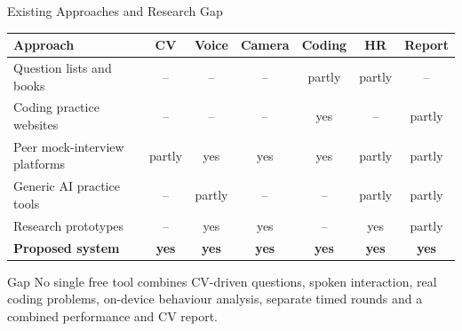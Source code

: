 \documentclass[aspectratio=169,11pt,xcolor=table]{beamer}
\begin{document}
\begin{frame}{Existing Approaches and Research Gap}
  \footnotesize
  \begin{tabularx}{\textwidth}{@{}Ycccccc@{}}
    \toprule
    \textbf{Approach} & \textbf{CV} & \textbf{Voice} & \textbf{Camera} & \textbf{Coding} & \textbf{HR} & \textbf{Report} \\
    \midrule
    Question lists and books & -- & -- & -- & partly & partly & -- \\
    Coding practice websites & -- & -- & -- & yes & -- & partly \\
    Peer mock-interview platforms & partly & yes & yes & yes & partly & partly \\
    Generic AI practice tools & -- & partly & -- & -- & partly & partly \\
    Research prototypes & -- & yes & yes & -- & yes & partly \\
    \textbf{Proposed system} & \textbf{yes} & \textbf{yes} & \textbf{yes} & \textbf{yes} & \textbf{yes} & \textbf{yes} \\
    \bottomrule
  \end{tabularx}
  \vspace{0.3cm}
  \begin{alertblock}{Gap}
    No single free tool combines CV-driven questions, spoken interaction, real coding problems, on-device behaviour analysis, separate timed rounds and a combined performance and CV report.
  \end{alertblock}
\end{frame}

\end{document}
